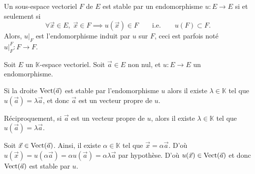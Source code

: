 \begin{rap}
	Un sous-espace vectoriel $F$\/ de $E$\/ est stable par un endomorphisme $u : E \to E$\/ si et seulement si \[
		\forall \vec{x} \in E,\;\vec{x} \in F \implies u(\vec{x}) \in F \qquad \text{i.e.}\qquad
		u(F) \subset F.
	\] Alors, $u\big|_F$\/ est l'endomorphisme induit par $u$\/ sur $F$, ceci est parfois noté $u\big|_F^F : F \to F$.
\end{rap}

\begin{prop}
	Soit $E$ un $\mathds{K}$-espace vectoriel. Soit $\vec{a} \in E$\/ non nul, et $u : E \to E$\/ un endomorphisme.

	Si la droite $\operatorname{Vect}(\vec{a})$\/ est stable par l'endomorphisme $u$\/ alors il existe $\lambda \in \mathds{K}$\/ tel que $u(\vec{a}) = \lambda \vec{a}$, et donc $\vec{a}$\/ est un vecteur propre de $u$.

	Réciproquement, si $\vec{a}$\/ est un vecteur propre de $u$, alors il existe $\lambda \in \mathds{K}$\/ tel que $u(\vec{a}) = \lambda \vec{a}$.
\end{prop}

\begin{prv}
	Soit $\vec{x} \in \operatorname{Vect}(\vec{a})$. Ainsi, il existe $\alpha \in \mathds{K}$\/ tel que $\vec{x} = \alpha \vec{a}$. D'où $u(\vec{x}) = u(\alpha\vec{a}) = \alpha u(\vec{a}) = \alpha \lambda \vec{a}$\/ par hypothèse. D'où $u(\vec{x}) \in \operatorname{Vect}(\vec{a})$\/ et donc $\operatorname{Vect}(\vec{a})$\/ est stable par $u$.
\end{prv}

